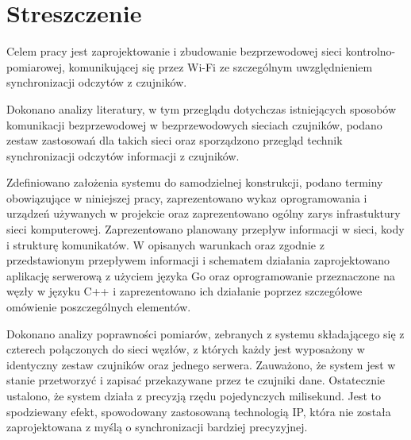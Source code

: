 \documentclass[12pt,oneside,a4paper]{book}
\theoremstyle{break}
\begin{document}
\chapter*{Streszczenie}
Celem pracy jest zaprojektowanie i zbudowanie bezprzewodowej 
sieci kontrolno-pomiarowej,
komunikującej się przez Wi-Fi ze szczególnym uwzględnieniem 
synchronizacji odczytów z czujników.
\par Dokonano analizy literatury, w tym przeglądu dotychczas 
istniejących sposobów komunikacji bezprzewodowej w bezprzewodowych
sieciach czujników, podano zestaw zastosowań dla takich sieci oraz
sporządzono przegląd technik synchronizacji odczytów informacji 
z czujników.
\par Zdefiniowano założenia systemu do samodzielnej konstrukcji,
podano terminy obowiązujące w niniejszej pracy,
zaprezentowano wykaz oprogramowania i urządzeń używanych 
w projekcie oraz zaprezentowano ogólny zarys 
infrastuktury sieci komputerowej. Zaprezentowano planowany
przepływ informacji w sieci, kody i strukturę komunikatów. 
W opisanych warunkach oraz zgodnie z przedstawionym 
przepływem informacji i schematem działania zaprojektowano
aplikację serwerową z użyciem języka Go oraz oprogramowanie
przeznaczone na węzły w języku C++ i zaprezentowano ich działanie poprzez
szczegółowe omówienie poszczególnych elementów. 
\par Dokonano analizy poprawności
pomiarów, zebranych z systemu składającego się z czterech 
połączonych do sieci węzłów, z których każdy jest wyposażony 
w identyczny zestaw czujników
oraz jednego serwera. Zauważono, że system jest w stanie
przetworzyć i zapisać przekazywane przez te czujniki dane.
Ostatecznie ustalono, że
system działa z precyzją rzędu pojedynczych milisekund. Jest to
spodziewany efekt,
spowodowany zastosowaną technologią IP, która nie została zaprojektowana
z myślą o synchronizacji bardziej precyzyjnej. 
\end{document}
